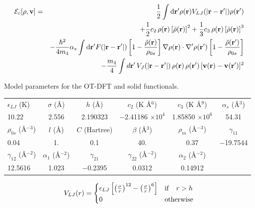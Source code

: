 \documentclass[11pt,a4paper,twoside]{article}
\begin{document}
			\begin{eqnarray}
			{\cal E}_c[\rho ,\mathbf{v}] &=&  
			\frac{1}{2} \int {\rm d}{\bf r'} \rho({\bf r}) V_{LJ}(|{\bf r}-{\bf r'}|) \rho({\bf r'}) 
			\nonumber \\
			&& + \frac{1}{2} c_2\, \rho({\bf r}) \left[{\bar \rho}({\bf r}) \right]^2 
			+ \frac{1}{3} c_3 \, \rho({\bf r}) \left[ {\bar \rho}({\bf r}) \right]^3 
			\nonumber \\
			&&- \frac{\hbar^2}{4m_4} \alpha_s \int {\rm d}{\bf r'} F(|{\bf r}-{\bf r'}|) 
			\left[ 1- \frac{{\tilde \rho}({\bf r})}{\rho_{0s}} \right]
			\nabla \rho({\bf r}) \cdot \nabla' \rho({\bf r'})
			\left[ 1- \frac{{\tilde \rho}({\bf r'})}{\rho_{0s}} \right] 
			\nonumber
			\\
			&& - \frac{m_4}{4} \int d\mathbf{r}' \,V_J(| \mathbf{r} - \mathbf{r}'|)\, \rho(\mathbf{r}) \, \rho(\mathbf{r}')\,  [\mathbf{v}(\mathbf{r}) - \mathbf{v}(\mathbf{r}')]^2
			\label{eq8}
			\end{eqnarray}		
			
			\begin{table}[t]
			Model parameters for the OT-DFT and solid functionals.
			\vspace{50pt}
			{\begin{tabular}{@{}lccccc}
			\hline
			\hline
			$\epsilon_{LJ}$  (K)    & $\sigma$ (\AA)& $h$ (\AA) & $c_2$ (K \AA$^6$)  & $c_3$ (K \AA$^9$) & $\alpha_s$ (\AA$^3$) \\
			 10.22   & 2.556 & 2.190323 & $-$2.41186 $\times 10^4$ & 1.85850 $\times 10^6$ & 54.31 \\
			\hline
			 $\rho_{0s}$ (\AA$^{-3}$)& $l$ (\AA)&$C$ (Hartree) &$\beta$ (\AA$^3$) & $\rho_m$ (\AA$^{-3}$) & $\gamma_{11}$ \\  
			  0.04& 1. & 0.1 &40.   & 0.37 & $-$19.7544 \\
			  \hline
			  $\gamma_{12}$ (\AA$^{-2}$)& $\alpha_1$  (\AA$^{-2}$) & $\gamma_{21}$  & $\gamma_{22}$ (\AA$^{-2}$) & $\alpha_2$ (\AA$^{-2}$) &      \\  
			   12.5616 &1.023 &  $-$0.2395 & 0.0312 & 0.14912  & \\
			\hline
			\hline
			\end{tabular}}
			\label{table1}
			\end{table}
			
			\begin{align}
				V_{LJ}(r) = \begin{cases}
				\epsilon_{LJ} \left[ \left(\frac{\sigma}{r} \right)^{12} - \left(\frac{\sigma}{r} \right)^{6} \right] & {\rm if} \quad r > h \\
				0 & {\rm otherwise}
				\end{cases}\label{eq9}
			\end{align}
			
\end{document}
